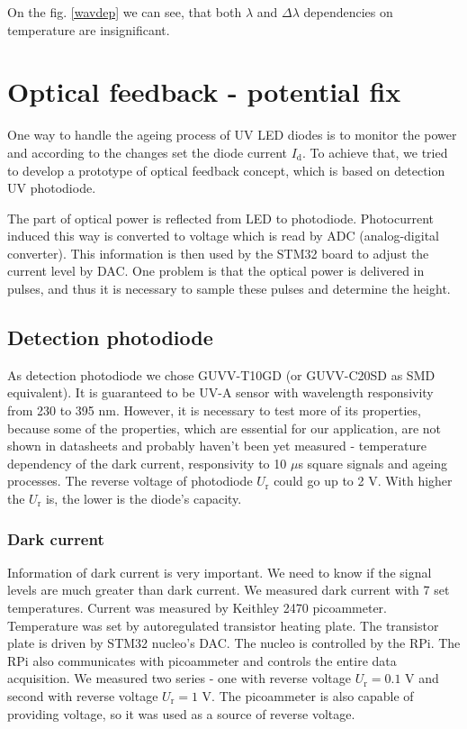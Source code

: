 On the fig. \ref{wavdep} we can see, that both $\lambda$ and $\Delta \lambda$ dependencies on temperature are insignificant.

\section{Optical feedback - potential fix}
One way to handle the ageing process of UV LED diodes is to monitor the power and according to the changes set the diode current $I_\textrm{d}$. To achieve that, we tried to develop a prototype of optical feedback concept, which is based on detection UV photodiode. 
\par
The part of optical power is reflected from LED to photodiode. Photocurrent induced this way is converted to voltage which is read by ADC (analog-digital converter). This information is then used by the STM32 board to adjust the current level by DAC. One problem is that the optical power is delivered in pulses, and thus it is necessary to sample these pulses and determine the height.
\par
\subsection{Detection photodiode}
As detection photodiode we chose GUVV-T10GD (or GUVV-C20SD as SMD equivalent). It is guaranteed to be UV-A sensor with wavelength responsivity from 230 to 395 nm. However, it is necessary to test more of its properties, because some of the properties, which are essential for our application, are not shown in datasheets and probably haven't been yet measured - temperature dependency of the dark current, responsivity to 10 $\mu$s square signals and ageing processes. The reverse voltage of photodiode $U_\textrm{r}$ could go up to 2 V. With higher the $U_\textrm{r}$ is, the lower is the diode's capacity.
\par
\subsubsection{Dark current}
Information of dark current is very important. We need to know if the signal levels are much greater than dark current. We measured dark current with 7 set temperatures. Current was measured by Keithley 2470 picoammeter. Temperature was set by autoregulated transistor heating plate. The transistor plate is driven by STM32 nucleo's DAC. The nucleo is controlled by the RPi. The RPi also communicates with picoammeter and controls the entire data acquisition. We measured two series - one with reverse voltage $U_\textrm{r} = 0.1$ V and second with reverse voltage $U_\textrm{r} = 1$ V. The picoammeter is also capable of providing voltage, so it was used as a source of reverse voltage.

